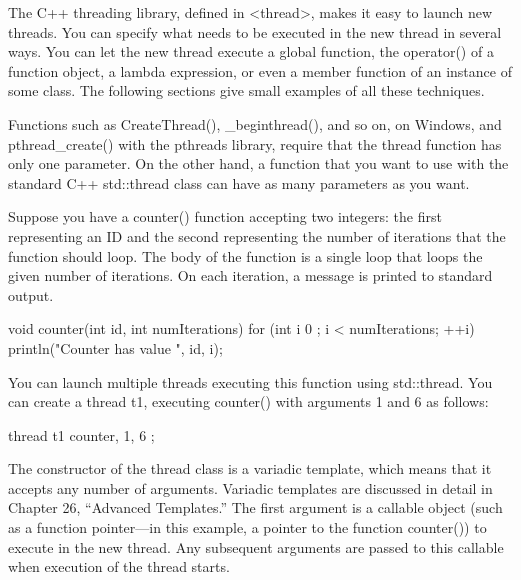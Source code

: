 
The C++ threading library, defined in <thread>, makes it easy to launch new threads. You can specify what needs to be executed in the new thread in several ways. You can let the new thread execute a global function, the operator() of a function object, a lambda expression, or even a member function of an instance of some class. The following sections give small examples of all these techniques.


Functions such as CreateThread(), \_beginthread(), and so on, on Windows, and pthread\_create() with the pthreads library, require that the thread function has only one parameter. On the other hand, a function that you want to use with the standard C++ std::thread class can have as many parameters as you want.

Suppose you have a counter() function accepting two integers: the first representing an ID and the second representing the number of iterations that the function should loop. The body of the function is a single loop that loops the given number of iterations. On each iteration, a message is printed to standard output.

\begin{cpp}
void counter(int id, int numIterations)
{
    for (int i { 0 }; i < numIterations; ++i) {
        println("Counter {} has value {}", id, i);
    }
}
\end{cpp}

You can launch multiple threads executing this function using std::thread. You can create a thread t1, executing counter() with arguments 1 and 6 as follows:

\begin{cpp}
thread t1 { counter, 1, 6 };
\end{cpp}

The constructor of the thread class is a variadic template, which means that it accepts any number of arguments. Variadic templates are discussed in detail in Chapter 26, “Advanced Templates.” The first argument is a callable object (such as a function pointer—in this example, a pointer to the function counter()) to execute in the new thread. Any subsequent arguments are passed to this callable when execution of the thread starts.


